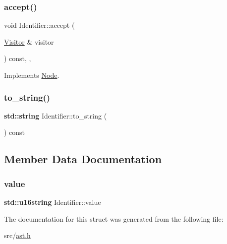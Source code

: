 \subsubsection{\texorpdfstring{accept()}{accept()}}
{\footnotesize\ttfamily void Identifier\+::accept (\begin{DoxyParamCaption}\item[{\hyperlink{struct_visitor}{Visitor} \&}]{visitor }\end{DoxyParamCaption}) const\hspace{0.3cm}{\ttfamily [inline]}, {\ttfamily [override]}, {\ttfamily [virtual]}}



Implements \hyperlink{struct_node_a10bd7af968140bbf5fa461298a969c71}{Node}.

\mbox{\label{struct_identifier_a86c253d449b695548284efd85ec2be4e}} 
\subsubsection{\texorpdfstring{to\+\_\+string()}{to\_string()}}
{\footnotesize\ttfamily \textbf{ std\+::string} Identifier\+::to\+\_\+string (\begin{DoxyParamCaption}{ }\end{DoxyParamCaption}) const\hspace{0.3cm}{\ttfamily [inline]}}



\subsection{Member Data Documentation}
\mbox{\label{struct_identifier_a1deb747305d88d9ccac5137a65838d63}} 
\subsubsection{\texorpdfstring{value}{value}}
{\footnotesize\ttfamily \textbf{ std\+::u16string} Identifier\+::value}



The documentation for this struct was generated from the following file\+:\begin{DoxyCompactItemize}
\item 
src/\hyperlink{ast_8h}{ast.\+h}\end{DoxyCompactItemize}
